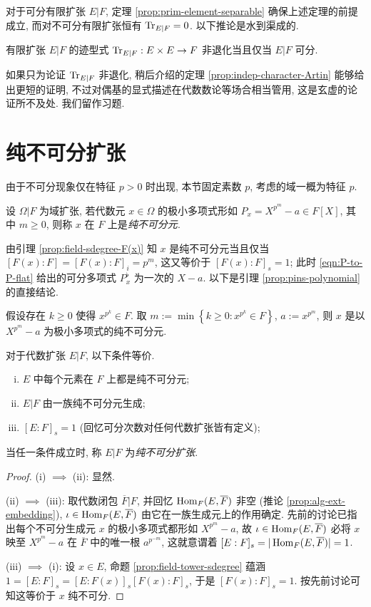 对于可分有限扩张 $E|F$, 定理 \ref{prop:prim-element-separable} 确保上述定理的前提成立, 而对不可分有限扩张恒有 $\operatorname{Tr}_{E|F}=0$. 以下推论是水到渠成的.
\begin{corollary}\label{prop:separable-discriminant}
	有限扩张 $E|F$ 的迹型式 $\operatorname{Tr}_{E|F}: E \times E \to F$ 非退化当且仅当 $E|F$ 可分.
\end{corollary}

如果只为论证 $\operatorname{Tr}_{E|F}$ 非退化, 稍后介绍的定理 \ref{prop:indep-character-Artin} 能够给出更短的证明, 不过对偶基的显式描述在代数数论等场合相当管用, 这是玄虚的论证所不及处. 我们留作习题.

\section{纯不可分扩张}\label{sec:pins}
由于不可分现象仅在特征 $p > 0$ 时出现, 本节固定素数 $p$, 考虑的域一概为特征 $p$.
\begin{definition}[纯不可分元]
	设 $\Omega|F$ 为域扩张, 若代数元 $x \in \Omega$ 的极小多项式形如 $P_x = X^{p^m}-a \in F[X]$, 其中 $m \geq 0$, 则称 $x$ 在 $F$ 上是\emph{纯不可分元}.
\end{definition}
由引理 \ref{prop:field-sdegree-F(x)} 知 $x$ 是纯不可分元当且仅当 $[F(x):F] = [F(x):F]_i = p^m$, 这又等价于 $[F(x):F]_s = 1$; 此时 \eqref{eqn:P-to-P-flat} 给出的可分多项式 $P^\flat_x$ 为一次的 $X-a$. 以下是引理 \ref{prop:pins-polynomial} 的直接结论.

\begin{proposition}
	假设存在 $k \geq 0$ 使得 $x^{p^k} \in F$. 取 $m := \min\left\{k \geq 0 : x^{p^k} \in F \right\}$, $a := x^{p^m}$, 则 $x$ 是以 $X^{p^m}-a$ 为极小多项式的纯不可分元.
\end{proposition}

\begin{definition-theorem}\label{def:pins}
	对于代数扩张 $E|F$, 以下条件等价.
	\begin{enumerate}[(i)]
		\item $E$ 中每个元素在 $F$ 上都是纯不可分元;
		\item $E|F$ 由一族纯不可分元生成;
		\item $[E:F]_s = 1$ (回忆可分次数对任何代数扩张皆有定义);
	\end{enumerate}
	当任一条件成立时, 称 $E|F$ 为\emph{纯不可分扩张}.
\end{definition-theorem}
\begin{proof}
	(i) $\implies$ (ii): 显然.

	(ii) $\implies$ (iii): 取代数闭包 $\overline{F}|F$, 并回忆 $\operatorname{Hom}_F(E, \overline{F})$ 非空 (推论 \ref{prop:alg-ext-embedding}), $\iota \in \operatorname{Hom}_F(E, \overline{F})$ 由它在一族生成元上的作用确定. 先前的讨论已指出每个不可分生成元 $x$ 的极小多项式都形如 $X^{p^m} - a$, 故 $\iota \in \operatorname{Hom}_F(E, \overline{F})$ 必将 $x$ 映至 $X^{p^m} - a$ 在 $\overline{F}$ 中的唯一根 $a^{p^{-m}}$, 这就意谓着 $[E:F]_s = |\operatorname{Hom}_F(E, \overline{F})| = 1$.
	
	(iii) $\implies$ (i): 设 $x \in E$, 命题 \ref{prop:field-tower-sdegree} 蕴涵 $1 = [E:F]_s = [E:F(x)]_s [F(x):F]_s$, 于是 $[F(x):F]_s = 1$. 按先前讨论可知这等价于 $x$ 纯不可分.
\end{proof}

